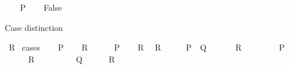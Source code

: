 \begin{isabellebody}
\ \ \isamarkupfalse%
\ {\isachardoublequoteopen}{\isasymnot}P{\isachardoublequoteclose}\isanewline
\ \ \isamarkupfalse%
\ {\isachardoublequoteopen}False{\isachardoublequoteclose}\ \isamarkupfalse%
\isanewline
{}\isamarkupfalse%
%
\endisatagproof
{\isafoldproof}%
%
\isadelimproof
%
\endisadelimproof
%
\begin{isamarkuptext}%
Case distinction%
\end{isamarkuptext}\isamarkuptrue%
\isamarkupfalse%
\ {\isachardoublequoteopen}R{\isachardoublequoteclose}\isanewline
%
\isadelimproof
%
\endisadelimproof
%
\isatagproof
{}\isamarkupfalse%
\ cases\isanewline
\ \ \isamarkupfalse%
\ {\isachardoublequoteopen}P{\isachardoublequoteclose}\isanewline
\ \ \isamarkupfalse%
\ {\isachardoublequoteopen}R{\isachardoublequoteclose}\ \isamarkupfalse%
\isanewline
{}\isamarkupfalse%
\isanewline
\ \ \isamarkupfalse%
\ {\isachardoublequoteopen}{\isasymnot}\ P{\isachardoublequoteclose}\isanewline
\ \ \isamarkupfalse%
\ {\isachardoublequoteopen}R{\isachardoublequoteclose}\ \isamarkupfalse%
\isanewline
{}\isamarkupfalse%
%
\endisatagproof
{\isafoldproof}%
%
\isadelimproof
\isanewline
%
\endisadelimproof
\isanewline
{}\isamarkupfalse%
\ {\isachardoublequoteopen}R{\isachardoublequoteclose}\isanewline
%
\isadelimproof
%
\endisadelimproof
%
\isatagproof
{}\isamarkupfalse%
\ {\isacharminus}{\kern0pt}\isanewline
\ \ \isamarkupfalse%
\ {\isachardoublequoteopen}P\ {\isasymor}\ Q{\isachardoublequoteclose}\ \isamarkupfalse%
\isanewline
\ \ \isamarkupfalse%
\ \isamarkupfalse%
\ {\isachardoublequoteopen}R{\isachardoublequoteclose}\isanewline
\ \ \isamarkupfalse%
\isanewline
\ \ \ \ \isamarkupfalse%
\ {\isachardoublequoteopen}P{\isachardoublequoteclose}\isanewline
\ \ \ \ \isamarkupfalse%
\ {\isachardoublequoteopen}R{\isachardoublequoteclose}\ \isamarkupfalse%
\isanewline
\ \ \isamarkupfalse%
\isanewline
\ \ \ \ \isamarkupfalse%
\ {\isachardoublequoteopen}Q{\isachardoublequoteclose}\isanewline
\ \ \ \ \isamarkupfalse%
\ {\isachardoublequoteopen}R{\isachardoublequoteclose}\ \isamarkupfalse%
\isanewline
\ \ \isamarkupfalse%
\isanewline

\end{isabellebody}
